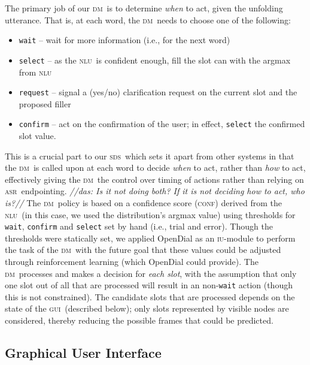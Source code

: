 \documentclass[11pt]{article}
\newcommand{\das}[1]{{\color{red}\emph{//das: #1//}}}
\newcommand{\sds}[0]{\textsc{sds}}
\newcommand{\nlu}[0]{\textsc{nlu}}
\newcommand{\asr}[0]{\textsc{asr}}
\newcommand{\dm}[0]{\textsc{dm}}
\newcommand{\ui}[0]{\textsc{gui}}
\newcommand{\iu}[0]{\textsc{iu}}
\newcommand{\conf}[0]{\textsc{conf}}
\begin{document}
The primary job of our \dm\ is to determine \emph{when} to act, given the unfolding utterance. That is, at each word, the \dm\ needs to choose one of the following:
\begin{itemize}
 \item \texttt{wait} -- wait for more information (i.e., for the next word) %
 \item \texttt{select} -- as the \nlu\ is confident enough, fill the slot can with the argmax from \nlu %
 \item \texttt{request} -- signal a (yes/no) clarification request on the current slot and the proposed filler%
 \item \texttt{confirm} -- act on the confirmation of the user; in effect, \texttt{select} the confirmed slot value.%
\end{itemize}

This is a crucial part to our \sds\ which sets it apart from other systems in that the \dm\ is called upon at each word to decide \emph{when} to act, rather than \emph{how} to act, effectively giving the \dm\ the control over timing of actions rather than relying on \asr\ endpointing. 
\das{Is it not doing both? If it is not deciding how to act, who is?}
The \dm\ policy is based on a confidence score (\conf) derived from the \nlu\ (in this case, we used the distribution's argmax value) using thresholds for \texttt{wait}, \texttt{confirm} and \texttt{select} set by hand (i.e., trial and error). Though the thresholds were statically set, we applied OpenDial \cite{Lison2015a} as an \iu-module to perform the task of the \dm\ with the future goal that these values could be adjusted through reinforcement learning (which OpenDial could provide). The \dm\ processes and makes a decision for \emph{each slot}, with the assumption that only one slot out of all that are processed will result in an non-\texttt{wait} action (though this is not constrained). The candidate slots that are processed depends on the state of the \ui\ (described below); only slots represented by visible nodes are considered, thereby reducing the possible frames that could be predicted.

\subsection{Graphical User Interface}
\label{section:display}
\end{document}
